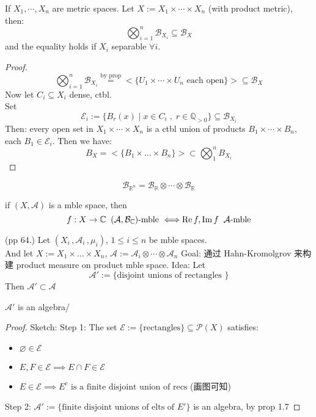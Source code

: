 \documentclass[lang=cn,11pt]{elegantbook}
\begin{document}
\begin{proposition}
    If $X_1,\cdots, X_n $ are metric spaces. Let $X := X_1 \times \cdots \times X_n$ (with product metric), then: $$\bigotimes_{i=1}^n \mathcal{B}_{X_i} \subseteq \mathcal{B}_X$$
and the equality holds if $X_i$ separable $\forall i$.
\end{proposition}
\begin{proof}
   $$\bigotimes_{i=1}^n \mathcal{B}_{X_i}  \overset{\text{by prop}}{=} < \{ U_1\times \cdots \times U_n  \text{ each open} \} > \subseteq\mathcal{B}_X $$
   Now let $C_i \subseteq X_i$ dense, ctbl. \\
   Set $$\mathcal{E}_i  := \{  B_r(x) \mid x\in C_i \;,\; r\in \mathbb{Q}_{>0}  \} \subseteq \mathcal{B}_{X_i} $$
   Then: every open set in $X_1 \times \cdots \times X_n$ is a ctbl union of products $B_1 \times \cdots \times B_n$, each $B_1 \in \mathcal{E}_i$.
   Then we have: $$B_X = <\{B_1 \times ...\times B_n\}> \subset \bigotimes_1^n B_{X_i}$$
\end{proof}

\begin{example}
    $$\mathcal{B}_{\mathbb{R}^n} = \mathcal{B}_{\mathbb{R}} \otimes \cdots \otimes \mathcal{B}_{\mathbb{R}}$$
\end{example}


\begin{corollary}
    if $(X,\mathcal{A})$ is a mble space, then $$f:X\rightarrow \mathbb{C}  \;\;(\mathcal{A},\mathcal{B}_{\mathbb{C}})\text{-mble } \Longleftrightarrow \operatorname{Re} f, \operatorname{Im} f \;\;\mathcal{A}\text{-mble}$$
\end{corollary}


   (pp 64.) Let $(X_i \,,\mathcal{A}_i\, , \mu_i)$, $1 \leq i \leq n$ be mble spaces.\\
    And let $X := X_1 \times ... \times X_n$, $\mathcal{A}:= \mathcal{A}_i \otimes \cdots \otimes \mathcal{A}_n$
Goal: 通过 Hahn-Kromolgrov 来构建 product measure on product mble space.
Idea: Let $$\mathcal{A}' := \{   \text{disjoint  unions of rectangles }\}$$
Then $\mathcal{A}' \subset \mathcal{A}$






\begin{proposition}
   $\mathcal{A}'$ is an algebra/
\end{proposition}
\begin{proof}
    Sketch:  
Step 1:
The set $\mathcal{E}:= \{\text{rectangles}\} \subseteq \mathcal{P}(X)$ satisfies:
    \begin{itemize}
        \item $\varnothing \in \mathcal{E}$
        \item $E,F \in \mathcal{E} \implies E \cap F \in \mathcal{E}$
        \item $E \in \mathcal{ E} \implies E^c \text{ is a finite disjoint union of recs}$ (画图可知)
    \end{itemize}

Step 2: $\mathcal{A}' := \{\text{finite disjoint unions of elts of } E'\} $ is an algebra, by prop 1.7


\end{proof}
\end{document}
